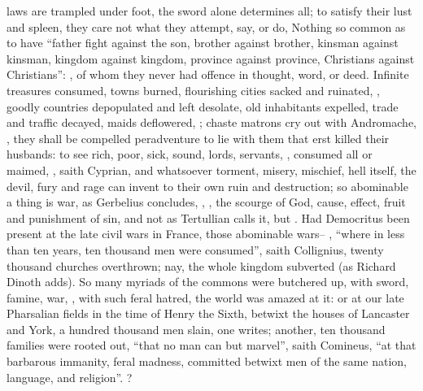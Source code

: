 laws are trampled under foot, the sword alone determines all; to satisfy their
lust and spleen, they care not what they attempt, say, or do,
Nothing so common as to have \enquote{father fight against the son,
brother against brother, kinsman against kinsman, kingdom against kingdom,
province against province, Christians against Christians}: , of whom they never had offence in thought,
word, or deed. Infinite treasures consumed, towns burned, flourishing cities
sacked and ruinated, , goodly countries
depopulated and left desolate, old inhabitants expelled, trade and traffic
decayed, maids deflowered, ; chaste matrons cry out with Andromache,
, they shall be compelled peradventure to lie with them that erst
killed their husbands: to see rich, poor, sick, sound, lords, servants,
, consumed all or maimed, \etc{} , saith Cyprian, and
whatsoever torment, misery, mischief, hell itself, the devil,
fury and rage can invent to their own ruin and destruction;
so abominable a thing is war, as Gerbelius concludes,
, \etc{}, the scourge of God, cause, effect, fruit and punishment
of sin, and not  as Tertullian calls it, but
. Had Democritus been present at the late civil wars in France, those
abominable wars-- , \enquote{where
in less than ten years, ten thousand men were consumed}, saith Collignius,
twenty thousand churches overthrown; nay, the whole kingdom subverted (as
Richard Dinoth adds). So many myriads of the commons were
butchered up, with sword, famine, war, , with such feral hatred, the world was
amazed at it: or at our late Pharsalian fields in the time of Henry the Sixth,
betwixt the houses of Lancaster and York, a hundred thousand men slain,
one writes; another, ten thousand
families were rooted out, \enquote{that no man can but marvel}, saith Comineus, \enquote{at
that barbarous immanity, feral madness, committed betwixt men of the same
nation, language, and religion}. ?

